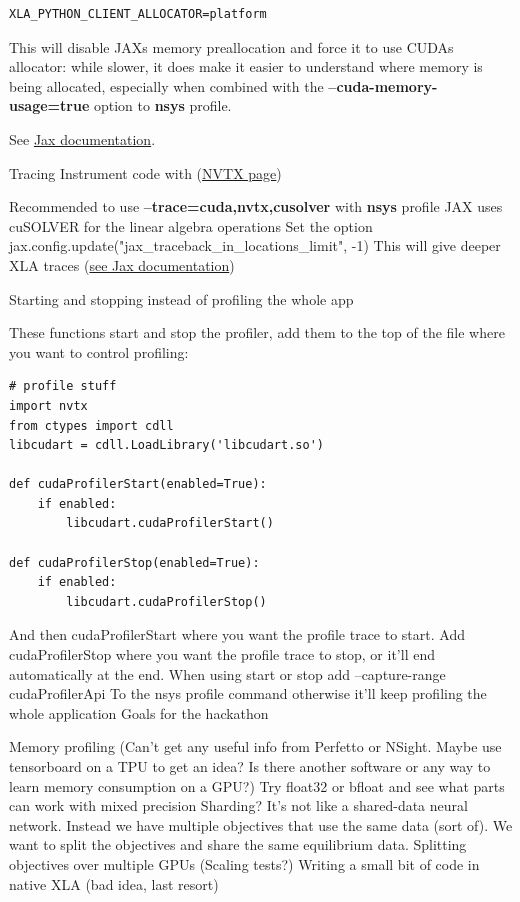 \begin{verbatim}
XLA_PYTHON_CLIENT_ALLOCATOR=platform
\end{verbatim}

This will disable JAXs memory preallocation and force it to use CUDAs allocator: while slower, it does make it easier to understand where memory is being allocated, especially when combined with the  \textbf{--cuda-memory-usage=true} option to \textbf{nsys} profile.

See \href{https://jax.readthedocs.io/en/latest/gpu_memory_allocation.html}{Jax documentation}.

Tracing
Instrument code with (\href{https://nvtx.readthedocs.io/en/latest/index.html}{NVTX page})

Recommended to use \textbf{--trace=cuda,nvtx,cusolver} with \textbf{nsys} profile
JAX uses cuSOLVER for the linear algebra operations
Set the option jax.config.update("jax\_traceback\_in\_locations\_limit", -1) 
This will give deeper XLA traces (\href{https://github.com/NVIDIA/JAX-Toolbox/blob/main/docs/profiling.md#tuning-jax-configuration-for-profiling}{see Jax documentation}) 

Starting and stopping instead of profiling the whole app

These functions start and stop the profiler, add them to the top of the file where you want to control profiling:

\begin{verbatim}
# profile stuff
import nvtx
from ctypes import cdll
libcudart = cdll.LoadLibrary('libcudart.so')

def cudaProfilerStart(enabled=True):
    if enabled:
        libcudart.cudaProfilerStart()

def cudaProfilerStop(enabled=True):
    if enabled:
        libcudart.cudaProfilerStop()
\end{verbatim}

And then cudaProfilerStart where you want the profile trace to start. Add cudaProfilerStop where you want the profile trace to stop, or it’ll end automatically at the end. When using start or stop add 
--capture-range cudaProfilerApi
To the nsys profile command otherwise it’ll keep profiling the whole application
Goals for the hackathon

Memory profiling (Can’t get any useful info from Perfetto or NSight. Maybe use tensorboard on a TPU to get an idea? Is there another software or any way to learn memory consumption on a GPU?)
Try float32 or bfloat and see what parts can work with mixed precision
Sharding? It’s not like a shared-data neural network. Instead we have multiple objectives that use the same data (sort of). We want to split the objectives and share the same equilibrium data.
Splitting objectives over multiple GPUs (Scaling tests?)
Writing a small bit of code in native XLA (bad idea, last resort)



